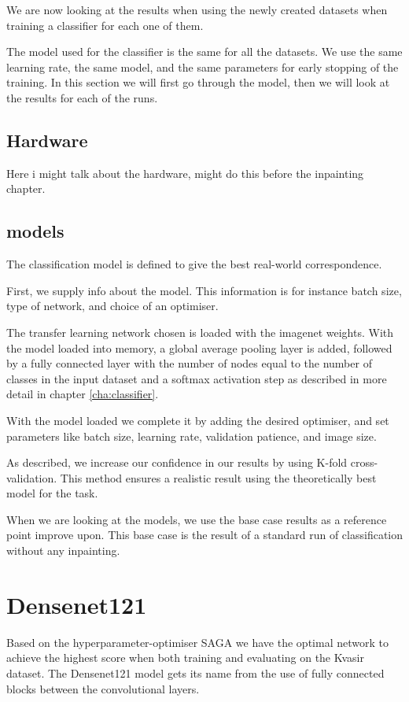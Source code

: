 We are now looking at the results when using the newly created datasets when training a classifier for each one of them. 


The model used for the classifier is the same for all the datasets. We use the same learning rate, the same model, and the same parameters for early stopping of the training.  In this section we will first go through the model, then we will look at the results for each of the runs.
\subsection{Hardware}
Here i might talk about the hardware, might do this before the inpainting chapter.


\subsection{models}
The classification model is defined to give the best real-world correspondence.

First, we supply info about the model. This information is for instance batch size, type of network, and choice of an optimiser. 

The transfer learning network chosen is loaded with the imagenet weights. With the model loaded into memory, a global average pooling layer is added, followed by a fully connected layer with the number of nodes equal to the number of classes in the input dataset and a softmax activation step as described in more detail in chapter \ref{cha:classifier}. 

With the model loaded we complete it by adding the desired optimiser, and set parameters like batch size, learning rate, validation patience, and image size.

As described, we increase our confidence in our results by using K-fold cross-validation. This method ensures a realistic result using the theoretically best model for the task. 

When we are looking at the models, we use the base case results as a reference point improve upon. This base case is the result of a standard run of classification without any inpainting.


\FloatBarrier
\section{Densenet121}


Based on the hyperparameter-optimiser SAGA we have the optimal network to achieve the highest score when both training and evaluating on the Kvasir dataset. 
The Densenet121 model gets its name from the use of fully connected blocks between the convolutional layers. 

